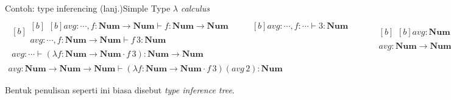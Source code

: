 \documentclass[aspectratio=1610,10pt,handout]{beamer}
\newcommand{\lc}{$\lambda$ {\it calculus}\ }
\begin{document}
\begin{frame}{Contoh: type inferencing (lanj.)}{Simple Type \lc }
	  \begingroup\tiny%
	  \[
	  \begin{gathered}
	  \begin{gathered}[b]
	  \begin{gathered}[b]
	  \begin{gathered}[b]
	  \hline
	  \mathit{avg} : \cdots,
	  f : \mathbf{Num} \to \mathbf{Num}
	  \vdash
	  f
	  :  \mathbf{Num} \to \mathbf{Num}
	  \end{gathered}
	  \qquad
	  \begin{gathered}[b]
	  \hline
	  \mathit{avg} : \cdots,
	  f : \cdots
	  \vdash
	  3
	  : \mathbf{Num}
	  \end{gathered}
	  \\
	  \hline
	  \mathit{avg} : \cdots,
	  f : \mathbf{Num} \to \mathbf{Num}
	  \vdash
	  f\,3
	  : \mathbf{Num}
	  \end{gathered}\\
	  \hline
	  \mathit{avg} : \cdots
	  \vdash
	  (\lambda f : \mathbf{Num} \to \mathbf{Num} \cdot f\,3)
	  : \mathbf{Num} \to \mathbf{Num}
	  \end{gathered}
	  \qquad
	  \begin{gathered}[b]
	  \begin{gathered}[b]
	  \hline
	  \mathit{avg} : \mathbf{Num} \to\mathbf{Num} \to\mathbf{Num} \vdash
	  \mathit{avg}
	  :  \mathbf{Num} \to\mathbf{Num} \to\mathbf{Num}
	  \end{gathered}
	  \qquad
	  \begin{gathered}[b]
	  \hline
	  \mathit{avg} : \cdots
	  \vdash
	  2
	  : \mathbf{Num}
	  \end{gathered}
	  \\
	  \hline
	  \mathit{avg} :  \mathbf{Num} \to\mathbf{Num} \to\mathbf{Num}
	  \vdash
	  \mathit{avg}\,2
	  : \mathbf{Num}
	  \end{gathered}
	  \\
	  \hline
	  \mathit{avg} : \mathbf{Num} \to\mathbf{Num} \to\mathbf{Num} \vdash
	  (\lambda f : \mathbf{Num} \to \mathbf{Num} \cdot f\,3) (\mathit{avg}\,2)
	  : \mathbf{Num}
	  \end{gathered}
	  \]
	  \endgroup%

	Bentuk penulisan seperti ini biasa disebut \emph{type inference tree}.

\end{frame}
\end{document}
